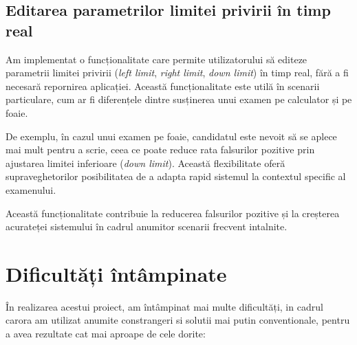 \documentclass[12pt,a4paper]{article}
\begin{document}
\subsection{Editarea parametrilor limitei privirii în timp real}
Am implementat o funcționalitate care permite utilizatorului să editeze parametrii limitei privirii (\textit{left limit}, \textit{right limit}, \textit{down limit}) în timp real, fără a fi necesară repornirea aplicației. Această funcționalitate este utilă în scenarii particulare, cum ar fi diferențele dintre susținerea unui examen pe calculator și pe foaie. 

De exemplu, în cazul unui examen pe foaie, candidatul este nevoit să se aplece mai mult pentru a scrie, ceea ce poate reduce rata falsurilor pozitive prin ajustarea limitei inferioare (\textit{down limit}). Această flexibilitate oferă supraveghetorilor posibilitatea de a adapta rapid sistemul la contextul specific al examenului.

Această funcționalitate contribuie la reducerea falsurilor pozitive și la creșterea acurateței sistemului în cadrul anumitor scenarii frecvent intalnite.

\section{Dificultăți întâmpinate}

În realizarea acestui proiect, am întâmpinat mai multe dificultăți, in cadrul carora am utilizat anumite constrangeri si solutii mai putin conventionale, pentru a avea rezultate cat mai aproape de cele dorite:
\end{document}
